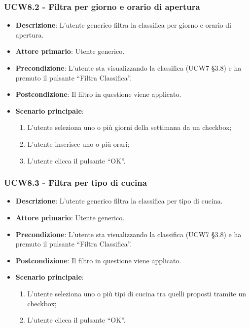 \subsubsection{UCW8.2 - Filtra per giorno e orario di apertura}
\begin{itemize}
	\item \textbf{Descrizione}: L'utente generico filtra la classifica per giorno e orario di apertura.
    \item \textbf{Attore primario}: Utente generico.
    \item \textbf{Precondizione}: L’utente sta visualizzando la classifica (UCW7 §3.8) e ha premuto il pulsante “Filtra Classifica”.
    \item \textbf{Postcondizione}: Il filtro in questione viene applicato.
    \item \textbf{Scenario principale}: 
    \begin{enumerate}
        \item L’utente seleziona uno o più giorni della settimana da un checkbox;
        \item L’utente inserisce uno o più orari;
        \item L’utente clicca il pulsante “OK”.
    \end{enumerate}
\end{itemize}

\subsubsection{UCW8.3 - Filtra per tipo di cucina}
\begin{itemize}
	\item \textbf{Descrizione}: L'utente generico filtra la classifica per tipo di cucina.
    \item \textbf{Attore primario}: Utente generico.
    \item \textbf{Precondizione}: L’utente sta visualizzando la classifica (UCW7 §3.8) e ha premuto il pulsante “Filtra Classifica”.
    \item \textbf{Postcondizione}: Il filtro in questione viene applicato.
    \item \textbf{Scenario principale}: 
    \begin{enumerate}
        \item L’utente seleziona uno o più tipi di cucina tra quelli proposti tramite un checkbox;
        \item L’utente clicca il pulsante “OK”.
    \end{enumerate}
\end{itemize}

